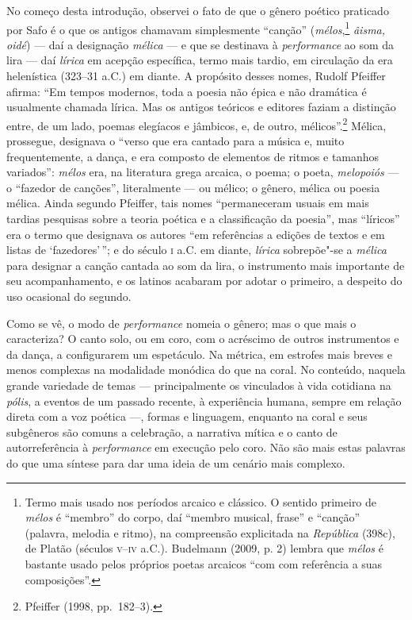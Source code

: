 No começo desta introdução, observei o fato de que o gênero poético praticado
por Safo é o que os antigos chamavam simplesmente “canção”
(\textit{mélos},\footnote{ Termo mais usado nos períodos arcaico e clássico.
O sentido primeiro de \textit{mélos} é “membro” do corpo, daí “membro
musical, frase” e “canção” (palavra, melodia e ritmo), na compreensão
explicitada na \textit{República} (398c), de Platão (séculos \textsc{v}--\textsc{iv} a.C.).
Budelmann (2009, p. 2) lembra que \textit{mélos} é bastante usado pelos próprios poetas arcaicos ``com com referência a suas composições”.} \textit{âisma, oidé}) --- daí a
designação \textit{mélica} --- e que se destinava à \textit{performance} ao som
da lira --- daí \textit{lírica} em acepção específica, termo mais tardio, em
circulação da era helenística (323--31 a.C.) em diante. A propósito
desses nomes, Rudolf Pfeiffer afirma: “Em tempos
modernos, toda a poesia não épica e não dramática é usualmente chamada lírica.
Mas os antigos teóricos e editores faziam a distinção entre, de um lado, poemas
elegíacos e jâmbicos, e, de outro, mélicos”.\footnote{ Pfeiffer (1998, pp.~182--3).} Mélica, prossegue,
designava o “verso que era cantado para a música e, muito frequentemente, a
dança, e era composto de elementos de ritmos e tamanhos variados”:
\textit{mélos} era, na literatura grega arcaica, o poema; o poeta,
\textit{melopoiós} --- o “fazedor de canções”, literalmente --- ou mélico; o
gênero, mélica ou poesia mélica. Ainda segundo Pfeiffer, tais nomes
“permaneceram usuais em mais tardias pesquisas sobre a teoria poética e a
classificação da poesia”, mas “líricos” era o termo que designava os autores
“em referências a edições de textos e em listas de ‘fazedores’\,”; e do século \textsc{i}
a.C. em diante, \textit{lírica} sobrepõe"-se a \textit{mélica} para designar a canção
cantada ao som da lira, o instrumento mais importante de seu acompanhamento, e
os latinos acabaram por adotar o primeiro, a despeito do uso ocasional do
segundo.

Como se vê, o modo de \textit{performance} nomeia o gênero;
mas o que mais o caracteriza? O canto solo,
ou em coro, com o acréscimo de
outros instrumentos e da dança, a configurarem um espetáculo. Na métrica,
em estrofes mais breves e menos
complexas na modalidade monódica do que na coral. No conteúdo, naquela grande variedade de temas --- principalmente os vinculados à
vida cotidiana na \textit{pólis}, a eventos de um passado recente, à
experiência humana, sempre em relação direta com a voz poética ---, formas e
linguagem, enquanto na coral e seus subgêneros são comuns a celebração, a
narrativa mítica e o canto de autorreferência à \textit{performance} em
execução pelo coro. Não são mais estas palavras do que uma síntese para dar uma ideia de um cenário mais complexo. 

